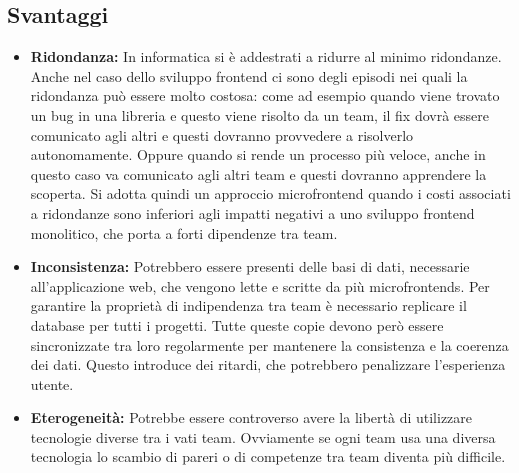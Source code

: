\subsection{Svantaggi}
\begin{itemize}

\item \textbf{Ridondanza:}
In informatica si è addestrati a ridurre al minimo ridondanze.
Anche nel caso dello sviluppo frontend ci sono degli episodi nei quali la ridondanza può
 essere molto costosa: come ad esempio quando viene trovato un bug in una libreria e 
 questo viene risolto da un team, il fix dovrà essere comunicato agli altri e questi 
 dovranno provvedere a risolverlo autonomamente. Oppure quando si rende un processo più 
 veloce, anche in questo caso va comunicato agli altri team e questi dovranno apprendere
  la scoperta.
Si adotta quindi un approccio microfrontend quando i costi associati a ridondanze sono 
inferiori agli impatti negativi a uno sviluppo frontend monolitico, che porta a forti 
dipendenze tra team.




\item \textbf{Inconsistenza:}
 Potrebbero essere presenti delle basi di dati, necessarie all'applicazione web, che vengono lette e scritte
 da più microfrontends.
Per garantire la proprietà di indipendenza tra team è necessario replicare il database per tutti i progetti. 
Tutte queste copie devono però essere sincronizzate tra loro regolarmente per mantenere la consistenza e la coerenza dei dati.
Questo introduce dei ritardi, che potrebbero penalizzare l'esperienza utente.

\item \textbf{Eterogeneità:}
Potrebbe essere controverso avere la libertà di utilizzare tecnologie diverse tra i vati team.
 Ovviamente se ogni team usa una diversa tecnologia lo scambio di pareri o di competenze 
 tra team diventa più difficile.
\end{itemize}